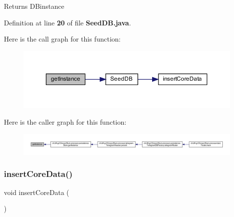 \begin{DoxyReturn}{Returns}
D\+Binstance 
\end{DoxyReturn}


Definition at line {\bf 20} of file {\bf Seed\+D\+B.\+java}.

Here is the call graph for this function\+:\nopagebreak
\begin{figure}[H]
\begin{center}
\leavevmode
\includegraphics[width=350pt]{d6/ddb/classch_1_1bfh_1_1gr33nopo55um_1_1enocean_1_1persistence_1_1SeedDB_afb73015d7926e727ea780d4fa03ca1a4_cgraph}
\end{center}
\end{figure}
Here is the caller graph for this function\+:\nopagebreak
\begin{figure}[H]
\begin{center}
\leavevmode
\includegraphics[width=350pt]{d6/ddb/classch_1_1bfh_1_1gr33nopo55um_1_1enocean_1_1persistence_1_1SeedDB_afb73015d7926e727ea780d4fa03ca1a4_icgraph}
\end{center}
\end{figure}
\label{classch_1_1bfh_1_1gr33nopo55um_1_1enocean_1_1persistence_1_1SeedDB_ad36fadbd4266f56a9ee31c9d948ffd51} 
\subsubsection{insert\+Core\+Data()}
{\footnotesize\ttfamily void insert\+Core\+Data (\begin{DoxyParamCaption}{ }\end{DoxyParamCaption})}



